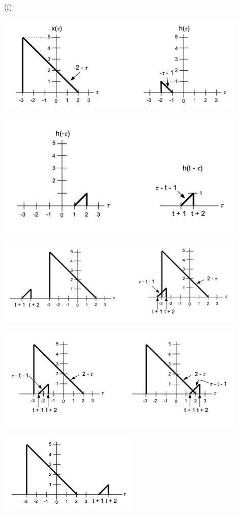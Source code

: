 \documentclass{article}
\begin{document}
(f)
\begin{center}
    \includegraphics[width=0.9\textwidth]{41f1.png}
\end{center}
\begin{center}
    \includegraphics[width=0.9\textwidth]{41f2.png}
\end{center}
\begin{center}
    \includegraphics[width=0.9\textwidth]{41f3.png}
\end{center}
\begin{center}
    \includegraphics[width=0.9\textwidth]{41f4.png}
\end{center}
\begin{center}
    \includegraphics[width=0.5\textwidth]{41f5.png}
\end{center}
\end{document}
